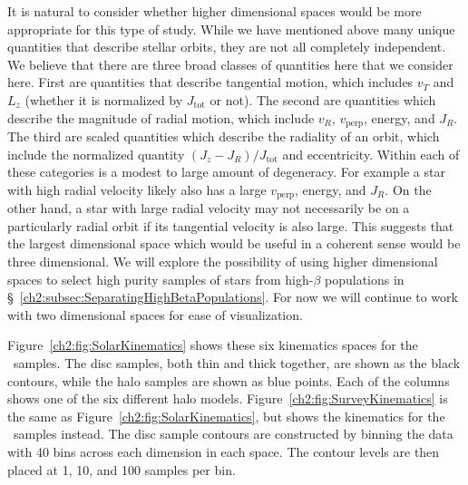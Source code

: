 It is natural to consider whether higher dimensional spaces would be more appropriate for this type of study. While we have mentioned above many unique quantities that describe stellar orbits, they are not all completely independent. We believe that there are three broad classes of quantities here that we consider here. First are quantities that describe tangential motion, which includes $v_{T}$ and $L_{z}$ (whether it is normalized by $J_\mathrm{tot}$ or not). The second are quantities which describe the magnitude of radial motion, which include $v_{R}$, $v_\mathrm{perp}$, energy, and $J_{R}$. The third are scaled quantities which describe the radiality of an orbit, which include the normalized quantity $(J_{z}-J_{R})/J_\mathrm{tot}$ and eccentricity. Within each of these categories is a modest to large amount of degeneracy. For example a star with high radial velocity likely also has a large $v_\mathrm{perp}$, energy, and $J_{R}$. On the other hand, a star with large radial velocity may not necessarily be on a particularly radial orbit if its tangential velocity is also large. This suggests that the largest dimensional space which would be useful in a coherent sense would be three dimensional. We will explore the possibility of using higher dimensional spaces to select high purity samples of stars from high-$\beta$ populations in \S~\ref{ch2:subsec:SeparatingHighBetaPopulations}. For now we will continue to work with two dimensional spaces for ease of visualization.


Figure~\ref{ch2:fig:SolarKinematics} shows these six kinematics spaces for the \solar\ samples. The disc samples, both thin and thick together, are shown as the black contours, while the halo samples are shown as blue points. Each of the columns shows one of the six different halo models. Figure~\ref{ch2:fig:SurveyKinematics} is the same as Figure~\ref{ch2:fig:SolarKinematics}, but shows the kinematics for the \survey\ samples instead. The disc sample contours are constructed by binning the data with 40 bins across each dimension in each space. The contour levels are then placed at 1, 10, and 100 samples per bin. 

